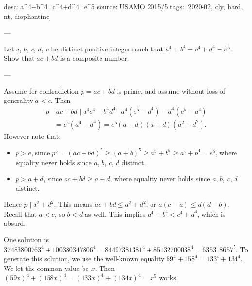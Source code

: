 desc: a^4+b^4=c^4+d^4=e^5
source: USAMO 2015/5
tags: [2020-02, oly, hard, nt, diophantine]

---

Let $a$, $b$, $c$, $d$, $e$ be distinct positive integers such that $a^4+b^4=c^4+d^4=e^5$. Show that $ac+bd$ is a composite number.

---

Assume for contradiction $p=ac+bd$ is prime, and assume without loss of generality $a<c$. Then
\begin{align*}
    p&\mid ac+bd
    \mid a^4c^4-b^4d^4
    \mid a^4\left(e^5-d^4\right)-d^4\left(e^5-a^4\right)\\
    &=e^5\left(a^4-d^4\right)
    =e^5(a-d)(a+d)\left(a^2+d^2\right).
\end{align*}
However note that:
\begin{itemize}
    \item $p>e$, since $p^5=(ac+bd)^5\ge(a+b)^5\ge a^5+b^5\ge a^4+b^4=e^5$, where equality never holds since $a$, $b$, $c$, $d$ distinct.
    \item $p>a+d$, since $ac+bd\ge a+d$, where equality never holds since $a$, $b$, $c$, $d$ distinct.
\end{itemize}
Hence $p\mid a^2+d^2$. This means $ac+bd\le a^2+d^2$, or $a(c-a)\le d(d-b)$. Recall that $a<c$, so $b<d$ as well. This implies $a^4+b^4<c^4+d^4$, which is absurd.
\begin{remark}
    One solution is $37483800763^4+100380347806^4=84497381381^4+85132700038^4=635318657^5$. To generate this solution, we use the well-known equality $59^4+158^4=133^4+134^4$. We let the common value be $x$. Then $(59x)^4+(158x)^4=(133x)^4+(134x)^4=x^5$ works.
\end{remark}
